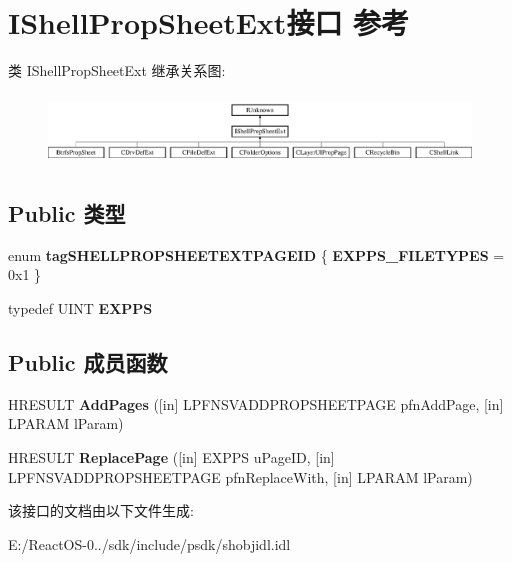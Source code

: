 \hypertarget{interface_i_shell_prop_sheet_ext}{}\section{I\+Shell\+Prop\+Sheet\+Ext接口 参考}
\label{interface_i_shell_prop_sheet_ext}
类 I\+Shell\+Prop\+Sheet\+Ext 继承关系图\+:\begin{figure}[H]
\begin{center}
\leavevmode
\includegraphics[height=1.860465cm]{interface_i_shell_prop_sheet_ext}
\end{center}
\end{figure}
\subsection*{Public 类型}
\begin{DoxyCompactItemize}
\item 
\mbox{\label{interface_i_shell_prop_sheet_ext_a4425c3512b71220a3af2704279a06fa8}} 
enum {\bfseries tag\+S\+H\+E\+L\+L\+P\+R\+O\+P\+S\+H\+E\+E\+T\+E\+X\+T\+P\+A\+G\+E\+ID} \{ {\bfseries E\+X\+P\+P\+S\+\_\+\+F\+I\+L\+E\+T\+Y\+P\+ES} = 0x1
 \}
\item 
\mbox{\label{interface_i_shell_prop_sheet_ext_a9aa5959923eee383c2acbacee1e630aa}} 
typedef U\+I\+NT {\bfseries E\+X\+P\+PS}
\end{DoxyCompactItemize}
\subsection*{Public 成员函数}
\begin{DoxyCompactItemize}
\item 
\mbox{\label{interface_i_shell_prop_sheet_ext_aba70ae847562cd8aaf0e772767f9a37e}} 
H\+R\+E\+S\+U\+LT {\bfseries Add\+Pages} (\mbox{[}in\mbox{]} L\+P\+F\+N\+S\+V\+A\+D\+D\+P\+R\+O\+P\+S\+H\+E\+E\+T\+P\+A\+GE pfn\+Add\+Page, \mbox{[}in\mbox{]} L\+P\+A\+R\+AM l\+Param)
\item 
\mbox{\label{interface_i_shell_prop_sheet_ext_a1710a73c780f2b8f89575ca6d004466b}} 
H\+R\+E\+S\+U\+LT {\bfseries Replace\+Page} (\mbox{[}in\mbox{]} E\+X\+P\+PS u\+Page\+ID, \mbox{[}in\mbox{]} L\+P\+F\+N\+S\+V\+A\+D\+D\+P\+R\+O\+P\+S\+H\+E\+E\+T\+P\+A\+GE pfn\+Replace\+With, \mbox{[}in\mbox{]} L\+P\+A\+R\+AM l\+Param)
\end{DoxyCompactItemize}


该接口的文档由以下文件生成\+:\begin{DoxyCompactItemize}
\item 
E\+:/\+React\+O\+S-\/0../sdk/include/psdk/shobjidl.\+idl\end{DoxyCompactItemize}
